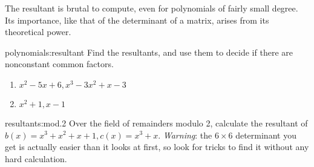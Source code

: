The resultant is brutal to compute, even for polynomials of fairly small degree.
Its importance, like that of the determinant of a matrix, arises from its theoretical power.

\begin{problem}{polynomials:resultant}
Find the resultants, and use them to decide if there are nonconstant common factors.
\begin{enumerate}
\item \(x^2-5x+6, x^3-3x^2+x-3\)
\item \(x^2+1,x-1\)
\end{enumerate} 
\end{problem}

\begin{problem}{resultants:mod.2}
Over the field of remainders modulo 2, calculate the resultant of \(b(x)=x^3+x^2+x+1, c(x)=x^3+x\).
\emph{Warning}: the \(6 \times 6\) determinant you get is actually easier than it looks at first, so look for tricks to find it without any hard calculation.
\end{problem}

